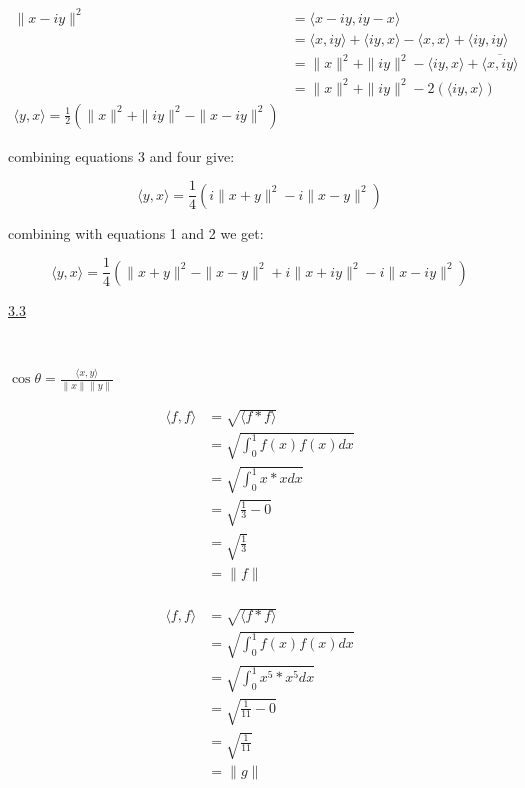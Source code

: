 \documentclass{article}
\begin{document}
\begin{equation} \label{eq4}
  \begin{split}
  \| x - iy \|^2 & = \langle x - iy, iy - x\rangle \\
  & = \langle x,iy \rangle + \langle iy,x\rangle - \langle x,x\rangle + \langle iy,iy \rangle \\
  & = \| x\|^2 + \| iy \|^2 -\langle iy,x\rangle + \overline{\langle x,iy \rangle} \\
  & = \| x\|^2 + \| iy \|^2 - 2( \langle iy,x\rangle ) \\
  \langle y,x\rangle = \frac{1}{2}(\| x\|^2 + \| iy \|^2 - \| x-iy \|^2)
 \end{split}
\end{equation}\label{eq4}

combining equations 3 and four give:

\[ \langle y,x\rangle =  \frac{1}{4} (i\| x + y \|^2 - i \| x - y \|^2) \]

combining with equations 1 and 2 we get:

\[ \langle y,x\rangle =\frac{1}{4} (\| x+ y \|^2 - \| x - y \|^2  + i\| x + iy \|^2 - i \| x - iy \|^2) \]


\underline{3.3}

\

$\cos\theta =\frac{\langle x,y \rangle}{ \| x\| \|y\|} $

\begin{equation}
  \begin{split}
  \langle f,f \rangle & = \sqrt{\langle f * f \rangle}\\
  & = \sqrt{\int_{0}^{1} f(x)f(x) dx}\\
  & = \sqrt{\int_{0}^{1} x * x dx}\\
  & = \sqrt{\frac{1}{3} - 0}\\
  & = \sqrt{\frac{1}{3}}\\
  & = \| f \|\\
  \end{split}
\end{equation}

\begin{equation}
  \begin{split}
  \langle f,f \rangle & = \sqrt{\langle f * f \rangle}\\
  & = \sqrt{\int_{0}^{1} f(x)f(x) dx}\\
  & = \sqrt{\int_{0}^{1} x^{5} * x^{5} dx}\\
  & = \sqrt{\frac{1}{11} - 0}\\
  & = \sqrt{\frac{1}{11}} \\
  & = \| g \|
  \end{split}
\end{equation}
\end{document}
